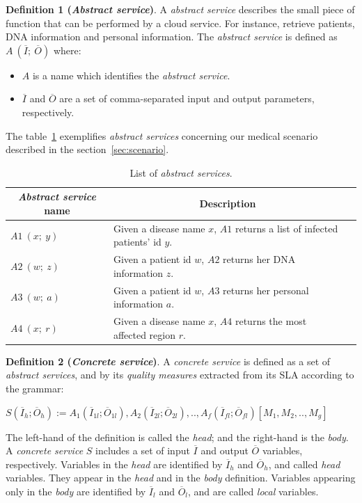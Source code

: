 \bigskip

\noindent \textbf{Definition 1 (\textit{Abstract service})}. A \textit{abstract service} describes the small piece of function that can be performed by a cloud service. For instance, retrieve patients, DNA information and personal information. The \textit{abstract service} is defined as $A \ (\overline{I}; \ \overline{O})$ where: 
\begin{itemize}
\item $A$ is a name which identifies the \textit{abstract service}.
\item $\overline{I}$ and $\overline{O}$ are a set of comma-separated input and output parameters, respectively.
\end{itemize}
The table~\ref{table:abstractservices} exemplifies \textit{abstract services} concerning our medical scenario described in the section~\ref{sec:scenario}.
%
%
\begin{table}[]
\centering
\begin{tabular}{|l|p{8cm}|l|}
\hline
\multicolumn{1}{|c|}{\textbf{\textit{Abstract service} name}} & \multicolumn{1}{c|}{\textbf{Description}} \\ \hline
$A1 \ (x; \ y)$ & Given a disease name $x$, $A1$ returns a list of infected patients' id $y$. \\ \hline
$A2 \ (w; \ z)$ & Given a patient id $w$, $A2$ returns her DNA information $z$. \\ \hline
$A3 \ (w; \ a)$ & Given a patient id $w$, $A3$ returns her personal information $a$.\\ \hline
$A4 \ (x; \ r)$ & Given a disease name $x$, $A4$ returns the most affected region $r$. \\ \hline
\end{tabular}
\caption{List of \textit{abstract services}.}
\label{table:abstractservices}
\end{table}
\bigskip

\noindent \textbf{Definition 2 (\textit{Concrete service})}. A \textit{concrete service} is defined as a set of \textit{abstract services}, and by its \textit{quality measures} extracted from its SLA according to the grammar:
%
\begin{center}
\begin{math}
S (\overline{I}_{h}; \overline{O}_{h}) := A_{1}(\overline{I}_{1l}; \overline{O}_{1l}), A_{2}(\overline{I}_{2l}; \overline{O}_{2l}), ..,  A_{f}(\overline{I}_{fl}; \overline{O}_{fl})[M_{1},M_{2}, ..,M_{g}]
\end{math}
\end{center}
%
The left-hand of the definition is called the \textit{head}; and the right-hand is the \textit{body}. 
A \textit{concrete service} $S$ includes a set of input $\overline{I}$ and output $\overline{O}$ variables, respectively.
Variables in the \textit{head} are identified by $\overline{I}_{h}$ and $\overline{O}_{h}$, and called \textit{head} variables. 
They appear in the \textit{head} and in the \textit{body} definition. 
Variables appearing only in the \textit{body} are identified by $\overline{I}_{l}$ and $\overline{O}_{l}$, and are called \textit{local} variables.

